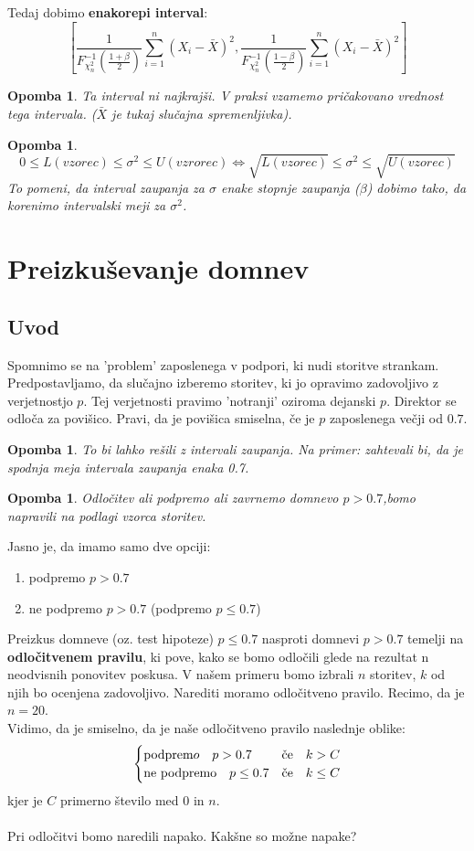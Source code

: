 \documentclass[11pt]{article}
\newtheorem{Opomba}[Izrek]{{\sc Opomba}}
\begin{document}
Tedaj dobimo \textbf{enakorepi interval}:
$$\left[\frac{1}{F_{\chi_n^2}^{-1}\left(\frac{1+\beta}{2}\right)}\sum_{i = 1}^{n}{(X_i - \bar{X})^2}, \frac{1}{F_{\chi_n^2}^{-1}\left(\frac{1-\beta}{2}\right)}\sum_{i = 1}^{n}{(X_i - \bar{X})^2}\right]$$
\begin{Opomba}
	Ta interval ni najkrajši. V praksi vzamemo pričakovano vrednost tega intervala. ($\bar{X}$ je tukaj slučajna spremenljivka).
\end{Opomba}
\begin{Opomba}
	$$0 \le L(vzorec) \le \sigma^2 \le U(vzrorec) \iff \sqrt{L(vzorec)} \le \sigma^2 \le \sqrt{U(vzorec)}$$
	To pomeni, da interval zaupanja za $\sigma$ enake stopnje zaupanja ($\beta$) dobimo tako, da korenimo intervalski meji za $\sigma^2$. 
\end{Opomba}
\section{Preizkuševanje domnev}
\subsection{Uvod}
Spomnimo se na 'problem' zaposlenega v podpori, ki nudi storitve strankam. Predpostavljamo, da slučajno izberemo storitev, ki jo opravimo zadovoljivo z verjetnostjo $p$. Tej verjetnosti pravimo 'notranji' oziroma dejanski $p$.
Direktor se odloča za povišico. Pravi, da je povišica smiselna, če je $p$ zaposlenega večji od $0.7$.
\begin{Opomba}
	To bi lahko rešili z intervali zaupanja. Na primer: zahtevali bi, da je spodnja meja intervala zaupanja enaka 0.7.
\end{Opomba}
\begin{Opomba}
	Odločitev ali podpremo ali zavrnemo domnevo $p> 0.7$,bomo napravili na podlagi vzorca storitev.
\end{Opomba}

Jasno je, da imamo samo dve opciji:
\begin{enumerate}
	\item 
	podpremo $p > 0.7$
	\item
	ne podpremo $p > 0.7$ (podpremo $p\le 0.7$)
\end{enumerate}

Preizkus domneve (oz. test hipoteze) $p\le 0.7$ nasproti domnevi $p>0.7$ temelji na \textbf{odločitvenem pravilu}, ki pove, kako se bomo odločili glede na rezultat n neodvisnih ponovitev poskusa.
V našem primeru bomo izbrali $n$ storitev, $k$ od njih bo ocenjena zadovoljivo. Narediti moramo odločitveno pravilo. Recimo, da je $n=20$.
\\
Vidimo, da je smiselno, da je naše odločitveno pravilo naslednje oblike:
\[
\begin{cases}
\textnormal{podprem}o\quad p>0.7 & \textnormal{če}\quad k>C\\
\textnormal{ne podpremo} \quad p\le 0.7  & \textnormal{če} \quad k\le C
\end{cases}
\]
kjer je $C$ primerno število med $0$ in $n$.
\\
\\
Pri odločitvi bomo naredili napako. Kakšne so možne napake?
\end{document}
